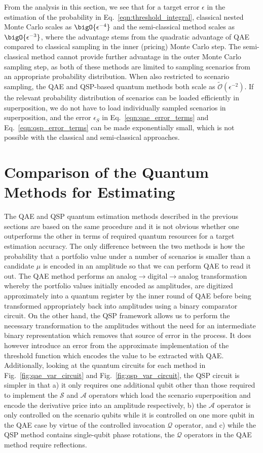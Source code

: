 \begin{enumerate}
From the analysis in this section, we see that for a target error $\epsilon$ in the estimation of the probability in Eq.~\eqref{eqn:threshold_integral}, classical nested Monte Carlo scales as $\bigO{\epsilon^{-4}}$ and the semi-classical method scales as $\bigO{\epsilon^{-3}}$, where the advantage stems from the quadratic advantage of QAE compared to classical sampling in the inner (pricing) Monte Carlo step.
The semi-classical method cannot provide further advantage in the outer Monte Carlo sampling step, as both of these methods are limited to sampling scenarios from an appropriate probability distribution.
When also restricted to scenario sampling, the QAE and QSP-based quantum methods both scale as $\tilde{\mathcal{O}}(\epsilon^{-2})$.
If the relevant probability distribution of scenarios can be loaded efficiently in superposition, we do not have to load individually sampled scenarios in superposition, and the error $\epsilon_S$ in Eq.~\eqref{eqn:qae_error_terms} and Eq.~\eqref{eqn:qsp_error_terms} can be made exponentially small, which is not possible with the classical and semi-classical approaches.

\section{Comparison of the Quantum Methods for Estimating \var{}}
\label{sec:compare_methods}
The QAE and QSP \var{} quantum estimation methods described in the previous sections are based on the same procedure and it is not obvious whether one outperforms the other in terms of required quantum resources for a target estimation accuracy.
The only difference between the two methods is how the probability that a portfolio value under a number of scenarios is smaller than a \var{} candidate $\mu$ is encoded in an amplitude so that we can perform QAE to read it out.
The QAE method performs an analog$\rightarrow$digital$\rightarrow$analog transformation whereby the portfolio values initially encoded as amplitudes, are digitized approximately into a quantum register by the inner round of QAE before being transformed appropriately back into amplitudes using a binary comparator circuit.
On the other hand, the QSP framework allows us to perform the necessary transformation to the amplitudes without the need for an intermediate binary representation which removes that source of error in the process.
It does however introduce an error from the approximate implementation of the threshold function which encodes the value to be extracted with QAE.
Additionally, looking at the quantum circuits for each method in Fig.~\ref{fig:qae_var_circuit} and Fig.~\ref{fig:qsp_var_circuit}, the QSP circuit is simpler in that a) it only requires one additional qubit other than those required to implement the $\mathcal{S}$ and $\mathcal{A}$ operators which load the scenario superposition and encode the derivative price into an amplitude respectively, b) the $\mathcal{A}$ operator is only controlled on the scenario qubits while it is controlled on one more qubit in the QAE case by virtue of the controlled invocation $\mathcal{Q}$ operator, and c) while the QSP method contains single-qubit phase rotations, the $\mathcal{Q}$ operators in the QAE method require reflections.


\end{enumerate}
